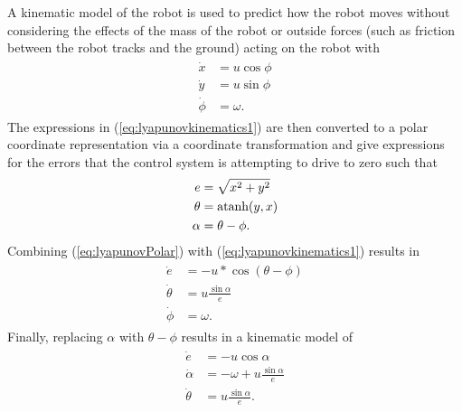 A kinematic model of the robot is used to predict how the robot moves without considering the effects of the mass of the robot or outside forces (such as friction between the robot tracks and the ground) acting on the robot with
\begin{align}
\label{eq:lyapunovkinematics1}
\begin{split}
\dot{x} &= u\cos\phi \\
\dot{y} &= u\sin\phi \\
\dot{\phi} &= \omega.
\end{split}
\end{align}
The expressions in (\ref{eq:lyapunovkinematics1}) are then converted to a polar coordinate representation via a coordinate transformation and give expressions for the errors that the control system is attempting to drive to zero such that
\begin{align}
\label{eq:lyapunovPolar}
\begin{split}
e &= \sqrt{x^2+y^2} \\
\theta &= \mathop{\text{atanh}}(y,x) \\
\alpha &= \theta - \phi.
\end{split}
\end{align}
Combining (\ref{eq:lyapunovPolar}) with (\ref{eq:lyapunovkinematics1}) results in
\begin{align*}
\begin{split}
\dot{e} &= -u*\cos(\theta-\phi) \\
\dot{\theta} &= u\frac{\sin\alpha}{e} \\
\dot{\phi} &= \omega.
\end{split}
\end{align*}
Finally, replacing $\alpha$ with $\theta-\phi$ results in a kinematic model of
\begin{align}
\label{eq:lyapunovkinematics}
\begin{split}
\dot{e} &= -u\cos\alpha \\
\dot{\alpha} &= -\omega + u\frac{\sin\alpha}{e} \\
\dot{\theta} &= u\frac{\sin\alpha}{e}.
\end{split}
\end{align}

